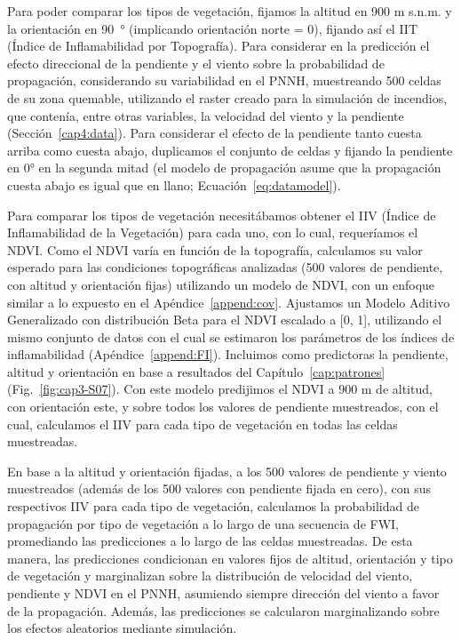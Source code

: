 Para poder comparar los tipos de vegetación, fijamos la altitud en 900 m s.n.m. y la orientación en 90~° (implicando orientación norte = 0), fijando así el IIT (Índice de Inflamabilidad por Topografía). Para considerar en la predicción el efecto direccional de la pendiente y el viento sobre la probabilidad de propagación, considerando su variabilidad en el PNNH, muestreando 500 celdas de su zona quemable, utilizando el raster creado para la simulación de incendios, que contenía, entre otras variables, la velocidad del viento y la pendiente (Sección~\ref{cap4:data}). Para considerar el efecto de la pendiente tanto cuesta arriba como cuesta abajo, duplicamos el conjunto de celdas y fijando la pendiente en 0° en la segunda mitad (el modelo de propagación asume que la propagación cuesta abajo es igual que en llano; Ecuación~\ref{eq:datamodel}). 

Para comparar los tipos de vegetación necesitábamos obtener el IIV (Índice de Inflamabilidad de la Vegetación) para cada uno, con lo cual, requeríamos el NDVI. Como el NDVI varía en función de la topografía, calculamos su valor esperado para las condiciones topográficas analizadas (500 valores de pendiente, con altitud y orientación fijas) utilizando un modelo de NDVI, con un enfoque similar a lo expuesto en el Apéndice~\ref{append:cov}. Ajustamos un Modelo Aditivo Generalizado con distribución Beta para el NDVI  escalado a [0, 1], utilizando el mismo conjunto de datos con el cual se estimaron los parámetros de los índices de inflamabilidad (Apéndice~\ref{append:FI}). Incluimos como predictoras la pendiente, altitud y orientación en base a resultados del Capítulo~\ref{cap:patrones} (Fig.~\ref{fig:cap3-S07}). Con este modelo predijimos el NDVI a 900 m de altitud, con orientación este, y sobre todos los valores de pendiente muestreados, con el cual, calculamos el IIV para cada tipo de vegetación en todas las celdas muestreadas.

En base a la altitud y orientación fijadas, a los 500 valores de pendiente y viento muestreados (además de los 500 valores con pendiente fijada en cero), con sus respectivos IIV para cada tipo de vegetación, calculamos la probabilidad de propagación por tipo de vegetación a lo largo de una secuencia de FWI, promediando las predicciones a lo largo de las celdas muestreadas. De esta manera, las predicciones condicionan en valores fijos de altitud, orientación y tipo de vegetación y marginalizan sobre la distribución de velocidad del viento, pendiente y NDVI en el PNNH, asumiendo siempre dirección del viento a favor de la propagación. Además, las predicciones se calcularon marginalizando sobre los efectos aleatorios mediante simulación. 

